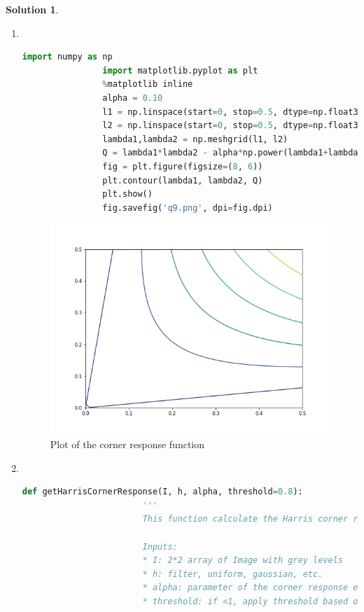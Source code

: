 \documentclass[11pt]{article}
\theoremstyle{plain}
\theoremstyle{definition}
\newtheorem{solution}{Solution}
\theoremstyle{remark}
\begin{document}
\begin{solution}

	\begin{enumerate}
		\item[a] \mbox{}\\		  
			\begin{lstlisting}[language=Python, caption=Plot the corner response function]
				import numpy as np
				import matplotlib.pyplot as plt
				%matplotlib inline
				alpha = 0.10
				l1 = np.linspace(start=0, stop=0.5, dtype=np.float32)
				l2 = np.linspace(start=0, stop=0.5, dtype=np.float32)
				lambda1,lambda2 = np.meshgrid(l1, l2)
				Q = lambda1*lambda2 - alpha*np.power(lambda1+lambda2,2)
				fig = plt.figure(figsize=(8, 6))
				plt.contour(lambda1, lambda2, Q)
				plt.show()
				fig.savefig('q9.png', dpi=fig.dpi)
			\end{lstlisting}
			
			\begin{figure}[h]
				\centering
				\includegraphics[width=\textwidth]{q9.png}
				\caption{Plot of the corner response function}
			\end{figure}
		
		\item[b] \mbox{}\\
			\begin{lstlisting}[language=Python, caption=Implementation of function $Q_a$]
				def getHarrisCornerResponse(I, h, alpha, threshold=0.8):
					    '''
					    This function calculate the Harris corner response funciton
					    
					    Inputs:
					    * I: 2*2 array of Image with grey levels
					    * h: filter, uniform, gaussian, etc.
					    * alpha: parameter of the corner response equation
					    * threshold: if <1, apply threshold based on the maximum of corner response value, otherwise, directly apply input value
					    

\end{lstlisting}
\end{enumerate}
\end{solution}
\end{document}
